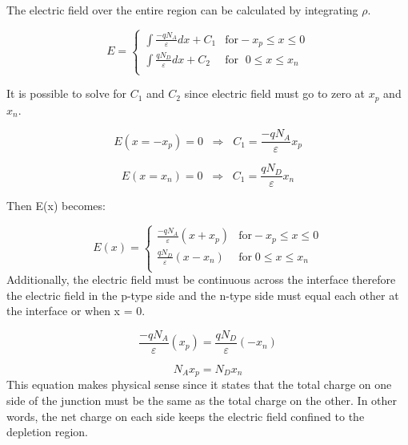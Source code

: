 \begin{doublespace}
The electric field over the entire region can be calculated by integrating $\rho$.

\begin{equation}
E = \begin{cases}
       \int \frac{-qN_{A}}{\varepsilon}  dx+ C_{1} & \text{for}  -x_{p}\leq x \leq 0 \\
       \int \frac{qN_{D}}{\varepsilon} dx+ C_{2}   & \text{for } \; 0 \leq x \leq x_{n}  \\
     \end{cases}
\end{equation}

It is possible to solve for $C_{1}$ and $C_{2}$ since electric field must go to zero at $x_{p}$ and $x_{n}$.

\begin{equation}
E(x=-x_{p})=0  \; \;  \Rightarrow  \;\; C_{1}= \frac{-qN_{A}}{\varepsilon}x_{p}
\end{equation}

\begin{equation}
E(x=x_{n})=0  \; \;  \Rightarrow  \;\; C_{1}= \frac{qN_{D}}{\varepsilon}x_{n}
\end{equation}

Then E(x) becomes:

\begin{equation}
E(x) = \begin{cases}
         \frac{-qN_{A}}{\varepsilon}(x+x_{p}) & \text{for}  -x_{p}\leq x \leq 0 \\
         \frac{qN_{D}}{\varepsilon}(x-x_{n})  &  \text{for} \; 0 \leq x \leq x_{n}  \\
     \end{cases}
\end{equation}
 Additionally, the electric field must be continuous across the interface therefore the electric field in the p-type side and the n-type side must equal each other at the interface or when x = 0. 

\begin{equation}
\frac{-qN_{A}}{\varepsilon}(x_{p})=\frac{qN_{D}}{\varepsilon}(-x_{n})
\end{equation}

\begin{equation}
N_{A}x_{p}=N_{D}x_{n}
\label{NAeqND}
\end{equation}This equation makes physical sense since it states that the total charge on one side of the junction must be the same as the total charge on the other. In other words, the net charge on each side keeps the electric field confined to the depletion region.


\end{doublespace}
